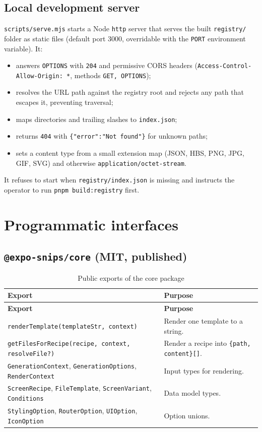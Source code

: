 \subsection*{Local development server}

\texttt{scripts/serve.mjs} starts a Node \texttt{http} server that serves the built
\texttt{registry/} folder as static files (default port 3000, overridable with the
\texttt{PORT} environment variable). It:

\begin{itemize}
  \item answers \texttt{OPTIONS} with \texttt{204} and permissive CORS headers
        (\texttt{Access-Control-Allow-Origin: *}, methods \texttt{GET, OPTIONS});
  \item resolves the URL path against the registry root and rejects any path that
        escapes it, preventing traversal;
  \item maps directories and trailing slashes to \texttt{index.json};
  \item returns \texttt{404} with \texttt{\{"error":"Not found"\}} for unknown paths;
  \item sets a content type from a small extension map (JSON, HBS, PNG, JPG, GIF,
        SVG) and otherwise \texttt{application/octet-stream}.
\end{itemize}

It refuses to start when \texttt{registry/index.json} is missing and instructs the
operator to run \texttt{pnpm build:registry} first.

\section{Programmatic interfaces}

\subsection*{\texttt{@expo-snips/core} (MIT, published)}

\begin{longtable}{@{}L{6.4cm}L{7.8cm}@{}}
\caption{Public exports of the core package}\\
\toprule
\textbf{Export} & \textbf{Purpose} \\
\midrule
\endfirsthead
\toprule
\textbf{Export} & \textbf{Purpose} \\
\midrule
\endhead
\texttt{renderTemplate(templateStr, context)} & Render one template to a string. \\
\texttt{getFilesForRecipe(recipe, context, resolveFile?)} & Render a recipe into
\texttt{\{path, content\}[]}. \\
\texttt{GenerationContext}, \texttt{GenerationOptions}, \texttt{RenderContext} & Input
types for rendering. \\
\texttt{ScreenRecipe}, \texttt{FileTemplate}, \texttt{ScreenVariant},
\texttt{Conditions} & Data model types. \\
\texttt{StylingOption}, \texttt{RouterOption}, \texttt{UIOption}, \texttt{IconOption} &
Option unions. \\
\bottomrule
\end{longtable}

